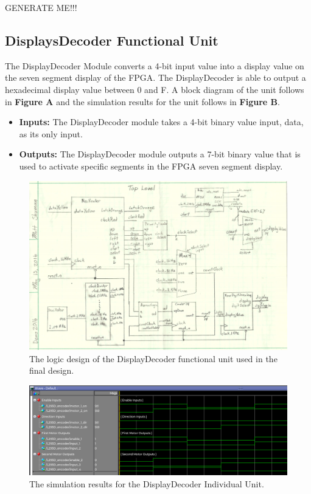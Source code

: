 \documentclass[a4paper]{article}
\begin{document}
\clearpage


GENERATE ME!!!


\clearpage



\subsection{DisplaysDecoder Functional Unit}
The DisplayDecoder Module converts a 4-bit input value into a display value on the seven segment display of the FPGA. The DisplayDecoder is
able to output a hexadecimal display value between 0 and F. A block diagram of the unit follows in \textbf{Figure A} and the simulation results for the unit follows in \textbf{Figure B}.
\begin{itemize}
  \item \textbf{Inputs:  } The DisplayDecoder module takes a 4-bit binary value input, data, as its only input.
  \item \textbf{Outputs: } The DisplayDecoder module outputs a 7-bit binary value that is used to activate specific segments in the FPGA seven segment display.
\end{itemize}
\begin{figure}[h]
  \centering
    \includegraphics[width=.8\textwidth]{images/functional_1.png}
	\caption{The logic design of the DisplayDecoder functional unit used in the final design.}
    \label{fig:functional-1}
\end{figure}
\begin{figure}[h]
  \centering
    \includegraphics[width=.98\textwidth]{sims/functional_1.png}
	\caption{The simulation results for the DisplayDecoder Individual Unit.}
    \label{fig:top-level-sim}
\end{figure}
\end{document}
